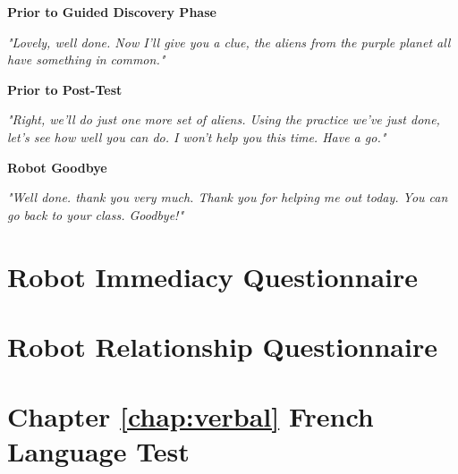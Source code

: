 \textbf{Prior to Guided Discovery Phase}

\textit{"Lovely, well done. Now I'll give you a clue, the aliens from the purple planet all have something in common."}

\textbf{Prior to Post-Test}

\textit{"Right, we'll do just one more set of aliens. Using the practice we've just done, let's see how well you can do. I won't help you this time. Have a go."}

\textbf{Robot Goodbye}

\textit{"Well done. thank you very much. Thank you for helping me out today. You can go back to your class. Goodbye!"}

\cleartooddpage
\chapter{Robot Immediacy Questionnaire} \label{app:riq}


\cleartooddpage
\chapter{Robot Relationship Questionnaire} \label{app:rrq}


\cleartooddpage
\chapter{Chapter \ref{chap:verbal} French Language Test} \label{app:frenchtest}
